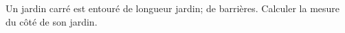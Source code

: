 \documentclass[exercice]{thedocument}%
\begin{document}
%
\smallskip\par\noindent Un jardin carré est entouré de \<longueur jardin;
de barrières.
Calculer la mesure du côté de son jardin.
\end{document}
